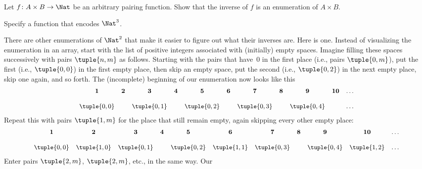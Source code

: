 \begin{prob}
Let $f \colon A \times B \to \Nat$ be an arbitrary pairing function.
Show that the inverse of $f$ is an enumeration of $A \times B$.
\end{prob}

\begin{prob}
Specify a function that encodes $\Nat^3$.
\end{prob}







\begin{explain}
There are other enumerations of $\Nat^2$ that make it easier to
figure out what their inverses are. Here is one. Instead of
visualizing the enumeration in an array, start with the list of
positive integers associated with (initially) empty spaces. Imagine
filling these spaces successively with pairs $\tuple{n,m}$ as follows.
Starting with the pairs that have~$0$ in  the first place (i.e., pairs
$\tuple{0,m}$), put the first (i.e., $\tuple{0,0}$) in the first empty
place, then skip an empty space, put the second (i.e., $\tuple{0,2}$)
in the next empty place, skip one again, and so forth. The
(incomplete) beginning of our enumeration now looks like this
\[\small
\begin{array}{@{}c c c c c c c c c c c@{}}
\mathbf 1 & \mathbf 2 & \mathbf 3 & \mathbf 4 & \mathbf 5 & \mathbf 6 & \mathbf 7 & \mathbf 8 & \mathbf 9 & \mathbf{10} & \dots \\ \\
\tuple{0,0} &  & \tuple{0,1} &  & \tuple{0,2} &  & \tuple{0,3} & & \tuple{0,4} &  & \dots \\
\end{array}
\]
Repeat this with pairs $\tuple{1,m}$ for the place that still remain
empty, again skipping every other empty place:
\[\small
\begin{array}{@{}c c c c c c c c c c c@{}}
\mathbf 1 & \mathbf 2 & \mathbf 3 & \mathbf 4 & \mathbf 5 & \mathbf 6 & \mathbf 7 & \mathbf 8 & \mathbf 9 & \mathbf{10} & \dots \\ \\
\tuple{0,0} & \tuple{1,0} & \tuple{0,1} &  & \tuple{0,2} & \tuple{1,1} & 
\tuple{0,3} & & \tuple{0,4} &  \tuple{1,2} & \dots \\
\end{array}
\]
Enter pairs $\tuple{2,m}$, $\tuple{2,m}$, etc., in the same way. Our

\end{explain}
